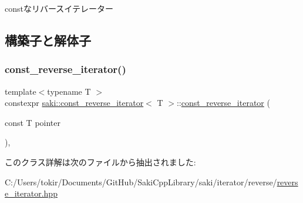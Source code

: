 constなリバースイテレーター 

\subsection{構築子と解体子}
\mbox{\label{classsaki_1_1const__reverse__iterator_ae696e711d884b66fb36c20262446cfae}} 
\subsubsection{\texorpdfstring{const\+\_\+reverse\+\_\+iterator()}{const\_reverse\_iterator()}}
{\footnotesize\ttfamily template$<$typename T $>$ \\
constexpr \mbox{\hyperlink{classsaki_1_1const__reverse__iterator}{saki\+::const\+\_\+reverse\+\_\+iterator}}$<$ T $>$\+::\mbox{\hyperlink{classsaki_1_1const__reverse__iterator}{const\+\_\+reverse\+\_\+iterator}} (\begin{DoxyParamCaption}\item[{const T}]{pointer }\end{DoxyParamCaption})\hspace{0.3cm}{\ttfamily [inline]}, {\ttfamily [explicit]}}



このクラス詳解は次のファイルから抽出されました\+:\begin{DoxyCompactItemize}
\item 
C\+:/\+Users/tokir/\+Documents/\+Git\+Hub/\+Saki\+Cpp\+Library/saki/iterator/reverse/\mbox{\hyperlink{reverse__iterator_8hpp}{reverse\+\_\+iterator.\+hpp}}\end{DoxyCompactItemize}
